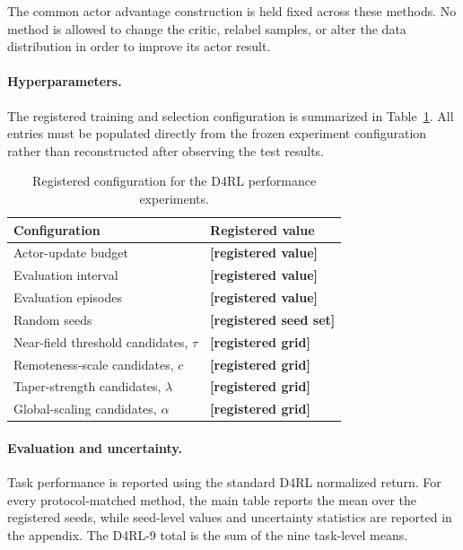 \documentclass{article}
\theoremstyle{plain}
\theoremstyle{definition}
\theoremstyle{remark}
\begin{document}
The common actor advantage construction is held fixed across these
methods. No method is allowed to change the critic, relabel samples, or
alter the data distribution in order to improve its actor result.

\paragraph{Hyperparameters.}

The registered training and selection configuration is summarized in
Table~\ref{tab:d4rl_registered_config}. All entries must be populated
directly from the frozen experiment configuration rather than
reconstructed after observing the test results.

\begin{table}[t]
\centering
\caption{Registered configuration for the D4RL performance experiments.}
\label{tab:d4rl_registered_config}

\small
\setlength{\tabcolsep}{8pt}
\renewcommand{\arraystretch}{1.12}

\begin{tabular}{@{}ll@{}}
\toprule
Configuration & Registered value \\
\midrule
Actor-update budget
& \textbf{[registered value]} \\
Evaluation interval
& \textbf{[registered value]} \\
Evaluation episodes
& \textbf{[registered value]} \\
Random seeds
& \textbf{[registered seed set]} \\
Near-field threshold candidates, $\tau$
& \textbf{[registered grid]} \\
Remoteness-scale candidates, $c$
& \textbf{[registered grid]} \\
Taper-strength candidates, $\lambda$
& \textbf{[registered grid]} \\
Global-scaling candidates, $\alpha$
& \textbf{[registered grid]} \\
\bottomrule
\end{tabular}
\end{table}

\paragraph{Evaluation and uncertainty.}

Task performance is reported using the standard D4RL normalized return.
For every protocol-matched method, the main table reports the mean over
the registered seeds, while seed-level values and uncertainty
statistics are reported in the appendix. The D4RL-9 total is the sum of
the nine task-level means.
\end{document}

